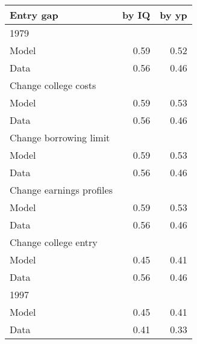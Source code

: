 \begin{tabular}{lrr}
\hline
Entry gap & by IQ  & by yp  \\ 
\hline
1979 &   &   \\ 
Model & 0.59  & 0.52  \\ 
Data & 0.56  & 0.46  \\ 
Change college costs &   &   \\ 
Model & 0.59  & 0.53  \\ 
Data & 0.56  & 0.46  \\ 
Change borrowing limit &   &   \\ 
Model & 0.59  & 0.53  \\ 
Data & 0.56  & 0.46  \\ 
Change earnings profiles &   &   \\ 
Model & 0.59  & 0.53  \\ 
Data & 0.56  & 0.46  \\ 
Change college entry &   &   \\ 
Model & 0.45  & 0.41  \\ 
Data & 0.56  & 0.46  \\ 
1997 &   &   \\ 
Model & 0.45  & 0.41  \\ 
Data & 0.41  & 0.33  \\ 
\hline
\end{tabular}%
